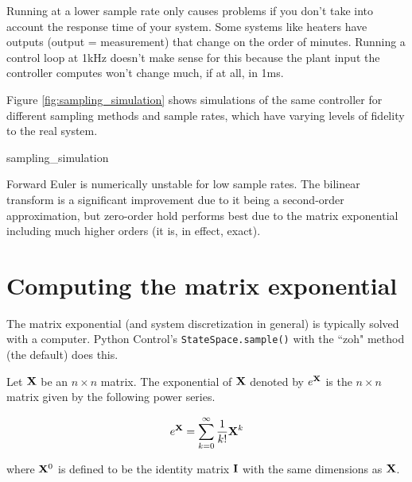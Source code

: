 Running at a lower sample rate only causes problems if you don't take into
account the response time of your system. Some systems like heaters have outputs
(output = measurement) that change on the order of minutes. Running a control
loop at 1kHz doesn't make sense for this because the plant input the controller
computes won't change much, if at all, in 1ms.

Figure \ref{fig:sampling_simulation} shows simulations of the same controller
for different sampling methods and sample rates, which have varying levels of
fidelity to the real system.

\begin{svg}{sampling_simulation}
  \caption{Sampling methods for system simulation.}
  \label{fig:sampling_simulation}
\end{svg}

Forward Euler is numerically unstable for low sample rates. The bilinear
transform is a significant improvement due to it being a second-order
approximation, but zero-order hold performs best due to the matrix exponential
including much higher orders (it is, in effect, exact).

\section{Computing the matrix exponential}

The matrix exponential (and system discretization in general) is typically
solved with a computer. Python Control's \texttt{StateSpace.sample()} with the
``zoh" method (the default) does this.

\begin{definition}
  Let $\mathbf{X}$ be an $n \times n$ matrix. The exponential of $\mathbf{X}$ denoted
  by $e^{\mathbf{X}}$ is the $n \times n$ matrix given by the following power
  series.

  \begin{equation}
    e^{\mathbf{X}} = \sum_{k=0}^\infty \frac{1}{k!} \mathbf{X}^k
  \end{equation}

  where $\mathbf{X}^0$ is defined to be the identity matrix $\mathbf{I}$ with the same
  dimensions as $\mathbf{X}$.
\end{definition}
